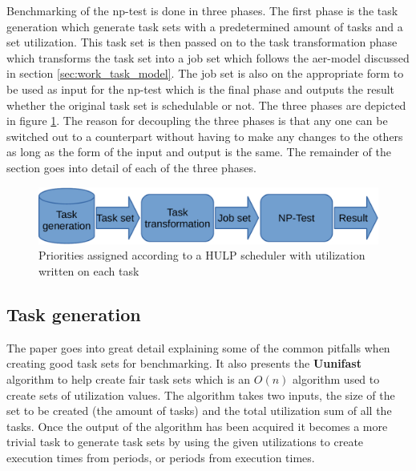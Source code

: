 \documentclass{kththesis}
\begin{document}
Benchmarking of the \acrshort{np}-test is done in three phases. The first phase is the task
generation which generate task sets with a predetermined amount of tasks and a set utilization. This
task set is then passed on to the task transformation phase which transforms the task set into a job
set which follows the \acrshort{aer}-model discussed in section \ref{sec:work_task_model}. The job
set is also on the appropriate form to be used as input for the \acrshort{np}-test which is the
final phase and outputs the result whether the original task set is schedulable or not. The three
phases are depicted in figure \ref{fig:benchmark_toolchain}. The reason for decoupling the three
phases is that any one can be switched out to a counterpart without having to make any changes to
the others as long as the form of the input and output is the same. The remainder of the section
goes into detail of each of the three phases. 

\begin{figure}

    \centering

    \includegraphics[width=0.8\linewidth]{images/benchmark_toolchain.pdf}

    \caption{Priorities assigned according to a HULP scheduler with utilization written on each task}

    \label{fig:benchmark_toolchain}

\end{figure}


\subsection{Task generation} \label{subsec:task_generation}

The paper \parencite{bini_measuring_2005} goes into great detail explaining some of the common pitfalls
when creating good task sets for benchmarking. It also presents the \textbf{Uunifast} algorithm to
help create fair task sets which is an $O(n)$ algorithm used to create sets of utilization values.
The algorithm takes two inputs, the size of the set to be created (the amount of tasks) and the
total utilization sum of all the tasks. Once the output of the algorithm has been acquired it
becomes a more trivial task to generate task sets by using the given utilizations to create
execution times from periods, or periods from execution times.
\end{document}
